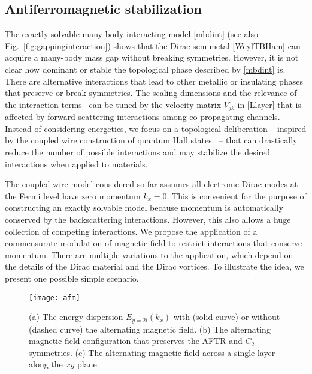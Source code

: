 \subsection{Antiferromagnetic stabilization}\label{sec:AFMstabilization}
The exactly-solvable many-body interacting model \eqref{mbdint} (see also Fig.~\ref{fig:gappinginteraction}) shows that the Dirac semimetal \eqref{WeylTBHam} can acquire a many-body mass gap without breaking symmetries. However, it is not clear how dominant or stable the topological phase described by \eqref{mbdint} is. There are alternative interactions that lead to other metallic or insulating phases that preserve or break symmetries. The scaling dimensions and the relevance of the interaction terms~\cite{Fradkinbook,Tsvelikbook} can be tuned by the velocity matrix $V_{jk}$ in \eqref{Llayer} that is affected by forward scattering interactions among co-propagating channels. Instead of considering energetics, we focus on a topological deliberation -- inspired by the coupled wire construction of quantum Hall states~\cite{KaneMukhopadhyayLubensky02,TeoKaneCouplewires} -- that can drastically reduce the number of possible interactions and may stabilize the desired interactions when applied to materials.

The coupled wire model considered so far assumes all electronic Dirac modes at the Fermi level have zero momentum $k_x=0$. This is convenient for the purpose of constructing an exactly solvable model because momentum is automatically conserved by the backscattering interactions. However, this also allows a huge collection of competing interactions. We propose the application of a commensurate modulation of magnetic field to restrict interactions that conserve momentum. There are multiple variations to the application, which depend on the details of the Dirac material and the Dirac vortices. To illustrate the idea, we present one possible simple scenario.

\begin{figure}[htbp]
	\centering\texttt{[image: afm]}
	\caption[Antiferromagnetic stabilization.]{(a) The energy dispersion $E_{y=2l}(k_x)$ with (solid curve) or without (dashed curve) the alternating magnetic field. (b) The alternating magnetic field configuration that preserves the AFTR and $C_2$ symmetries. (c) The alternating magnetic field across a single layer along the $xy$ plane.}\label{fig:afm}
\end{figure}

